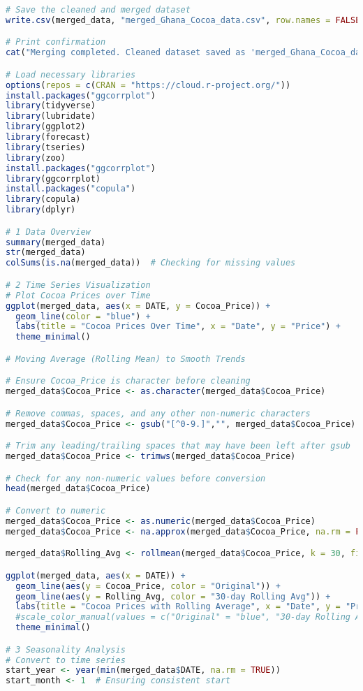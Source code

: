 \begin{lstlisting}[language=R]
# Save the cleaned and merged dataset
write.csv(merged_data, "merged_Ghana_Cocoa_data.csv", row.names = FALSE)

# Print confirmation
cat("Merging completed. Cleaned dataset saved as 'merged_Ghana_Cocoa_data.csv'\n")

# Load necessary libraries
options(repos = c(CRAN = "https://cloud.r-project.org/"))
install.packages("ggcorrplot")
library(tidyverse)
library(lubridate)
library(ggplot2)
library(forecast)
library(tseries)
library(zoo)
install.packages("ggcorrplot")
library(ggcorrplot)
install.packages("copula")
library(copula)
library(dplyr)

# 1 Data Overview
summary(merged_data)
str(merged_data)
colSums(is.na(merged_data))  # Checking for missing values

# 2 Time Series Visualization
# Plot Cocoa Prices over Time
ggplot(merged_data, aes(x = DATE, y = Cocoa_Price)) +
  geom_line(color = "blue") +
  labs(title = "Cocoa Prices Over Time", x = "Date", y = "Price") +
  theme_minimal()

# Moving Average (Rolling Mean) to Smooth Trends

# Ensure Cocoa_Price is character before cleaning
merged_data$Cocoa_Price <- as.character(merged_data$Cocoa_Price)

# Remove commas, spaces, and any other non-numeric characters
merged_data$Cocoa_Price <- gsub("[^0-9.]","", merged_data$Cocoa_Price)

# Trim any leading/trailing spaces that may have been left after gsub
merged_data$Cocoa_Price <- trimws(merged_data$Cocoa_Price)

# Check for any non-numeric values before conversion
head(merged_data$Cocoa_Price)

# Convert to numeric
merged_data$Cocoa_Price <- as.numeric(merged_data$Cocoa_Price)
merged_data$Cocoa_Price <- na.approx(merged_data$Cocoa_Price, na.rm = FALSE)

merged_data$Rolling_Avg <- rollmean(merged_data$Cocoa_Price, k = 30, fill = NA)

ggplot(merged_data, aes(x = DATE)) +
  geom_line(aes(y = Cocoa_Price, color = "Original")) +
  geom_line(aes(y = Rolling_Avg, color = "30-day Rolling Avg")) +
  labs(title = "Cocoa Prices with Rolling Average", x = "Date", y = "Price") +
  #scale_color_manual(values = c("Original" = "blue", "30-day Rolling Avg" = "red")) +
  theme_minimal()

# 3 Seasonality Analysis
# Convert to time series
start_year <- year(min(merged_data$DATE, na.rm = TRUE))
start_month <- 1  # Ensuring consistent start


\end{lstlisting}
